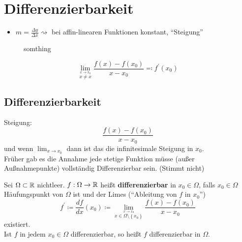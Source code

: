 \section{Differenzierbarkeit}
\begin{itemize}
	\item $ m = \frac{ \Delta y }{ \Delta x } \rightsquigarrow $ bei affin-linearen Funktionen konstant, ``Steigung''
\end{itemize}

\begin{figure}[H]
	\centering
	\caption{somthing}
	\label{somthing}
\end{figure}
\[
	\lim_{\overset{x\to x_0}{x \neq x}} \frac{ f(x) - f(x_0) }{ x - x_0 } \eqqcolon f^\prime(x_0) 
\]

\subsection{Differenzierbarkeit}
Steigung:
\[
	\frac{ f(x) - f(x_0) }{ x - x_0 } 
\]
und wenn $ \lim_{x \to x_0}  $ dann ist das die infinitesimale Steigung in $ x_0 $.\\
Früher gab es die Annahme jede stetige Funktion müsse (außer Außnahmepunkte) vollständig Differenzierbar sein. (Stimmt nicht)
\begin{subdefinition}
	Sei $ \Omega \subset \mathbb{R}  $ nichtleer. $ f: \Omega \to \mathbb{R}  $ heißt \textbf{differenzierbar} in $ x_0 \in \Omega $, falls $ x_0 \in \Omega $ Häufungspunkt von $ \Omega $ ist und der Limes (``Ableitung von $ f $ in $ x_0 $'')
	\[
		f^\prime \coloneqq \frac{ df }{ dx } (x_0) \coloneqq \lim_{\overset{x\to x_0}{x \in \Omega\setminus \left\{ x_0 \right\} }} \frac{ f(x) - f(x_0) }{ x - x_0 } 
	\]
	existiert.\\
	Ist $ f $ in jedem $ x_0 \in \Omega $ differenzierbar, so heißt $ f $ differenzierbar in $ \Omega $.
\end{subdefinition}

